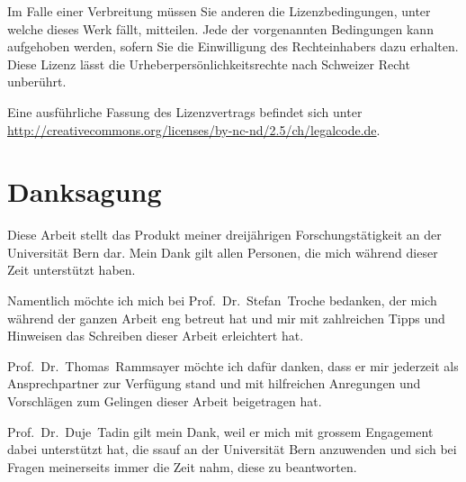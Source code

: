 \documentclass[11pt, twoside, a4paper]{book}		%
\begin{document}
\begin{titlepage}
	\RaggedRight Im Falle einer Verbreitung müssen Sie anderen die Lizenzbedingungen, unter welche dieses Werk fällt, mitteilen. Jede der vorgenannten Bedingungen kann aufgehoben werden, sofern Sie die Einwilligung des Rechteinhabers dazu erhalten. Diese Lizenz lässt die Urheberpersönlichkeitsrechte nach Schweizer Recht unberührt. 
	
	\hspace{1cm}
	
	Eine ausführliche Fassung des Lizenzvertrags befindet sich unter \url{http://creativecommons.org/licenses/by-nc-nd/2.5/ch/legalcode.de}.

\end{titlepage}
\restoregeometry

\setlength{\evensidemargin}{46pt}%
\setlength{\oddsidemargin}{46pt}%


\chapter*{\LARGE Danksagung}

\vspace{-.7cm}

Diese Arbeit stellt das Produkt meiner dreijährigen Forschungstätigkeit an der Universität Bern dar. Mein Dank gilt allen Personen, die mich während dieser Zeit unterstützt haben.

Namentlich möchte ich mich bei \mbox{Prof. Dr. Stefan Troche} bedanken, der mich während der ganzen Arbeit eng betreut hat und mir mit zahlreichen Tipps und Hinweisen das Schreiben dieser Arbeit erleichtert hat.

\mbox{Prof. Dr. Thomas Rammsayer} möchte ich dafür danken, dass er mir jederzeit als Ansprechpartner zur Verfügung stand und mit hilfreichen Anregungen und Vorschlägen zum Gelingen dieser Arbeit beigetragen hat.

\mbox{Prof. Dr. Duje Tadin} gilt mein Dank, weil er mich mit grossem Engagement dabei unterstützt hat, die \gls*{ssauf} an der Universität Bern anzuwenden und sich bei Fragen meinerseits immer die Zeit nahm, diese zu beantworten. 
\end{document}
